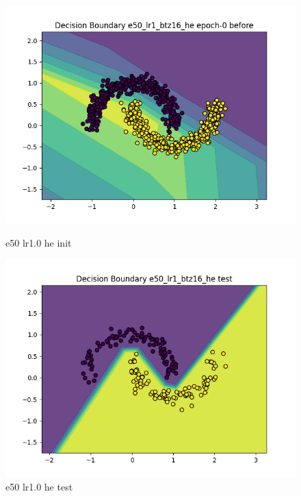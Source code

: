 \documentclass[8pt]{article}
\begin{document}
\begin{figure}[H]
    \centering
    \begin{minipage}{0.32\textwidth}
        \centering
        \includegraphics[width=\textwidth]{../Prob4/out/1024_173617/e50_lr1_btz16_he/decision_boundary_epoch-0 before.png}
        \caption{e50 lr1.0 he init}
        \label{fig:e50 lr1.0 he init}
    \end{minipage}
    \begin{minipage}{0.32\textwidth}
        \centering
        \includegraphics[width=\textwidth]{../Prob4/out/1024_173617/e50_lr1_btz16_he/decision_boundary_test.png}
        \caption{e50 lr1.0 he test}
        \label{fig:e50 lr1.0 he test}
    \end{minipage}

\end{figure}
\end{document}
